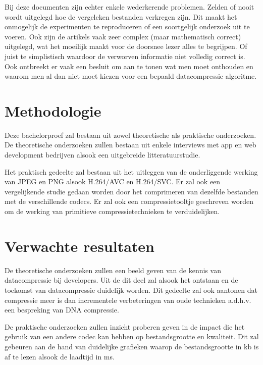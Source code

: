 Bij deze documenten zijn echter enkele wederkerende problemen. Zelden of nooit wordt uitgelegd hoe de vergeleken bestanden verkregen zijn. Dit maakt het onmogelijk de experimenten te reproduceren of een soortgelijk onderzoek uit te voeren. Ook zijn de artikels vaak zeer complex (maar mathematisch correct) uitgelegd, wat het moeilijk maakt voor de doorsnee lezer alles te begrijpen. Of juist te simplistisch waardoor de verworven informatie niet volledig correct is. Ook ontbreekt er vaak een besluit om aan te tonen wat men moet onthouden en waarom men al dan niet moet kiezen voor een bepaald datacompressie algoritme. 

\section{Methodologie}
\label{sec:methodologie}

Deze bachelorproef zal bestaan uit zowel theoretische als praktische onderzoeken. De theoretische onderzoeken zullen bestaan uit enkele interviews met app en web development bedrijven alsook een uitgebreide litteratuurstudie.

Het praktisch gedeelte zal bestaan uit het uitleggen van de onderliggende werking van JPEG en PNG alsook H.264/AVC en H.264/SVC. Er zal ook een vergelijkende studie gedaan worden door het comprimeren van dezelfde bestanden met de verschillende codecs. Er zal ook een compressietooltje geschreven worden om de werking van primitieve compressietechnieken te verduidelijken.

\section{Verwachte resultaten}
\label{sec:verwachte_resultaten}

De theoretische onderzoeken zullen een beeld geven van de kennis van datacompressie bij developers. Uit de dit deel zal alsook het ontstaan en de toekomst van datacompressie duidelijk worden. Dit gedeelte zal ook aantonen dat compressie meer is dan incrementele verbeteringen van oude technieken a.d.h.v. een bespreking van DNA compressie.

De praktische onderzoeken zullen inzicht proberen geven in de impact die het gebruik van een andere codec kan hebben op bestandsgrootte en kwaliteit. Dit zal gebeuren aan de hand van duidelijke grafieken waarop de bestandsgrootte in kb is af te lezen alsook de laadtijd in ms.

